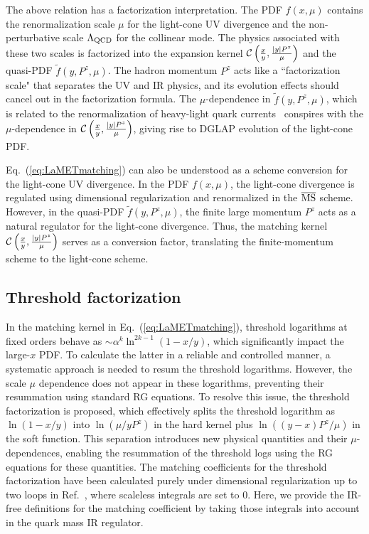 \documentclass[a4paper,11pt]{article}
\begin{document}
The above relation has a factorization interpretation. The PDF $ f(x,\mu) $ contains the renormalization scale $ \mu $ for the light-cone UV divergence and the non-perturbative scale $ \Lambda_{\rm QCD} $ for the collinear mode. The physics associated with these two scales is factorized into the expansion kernel $ {\cal C}\left(\frac{x}{y},\frac{|y| P^z}{\mu}\right) $ and the quasi-PDF $ \tilde{f}(y,P^z,\mu) $. The hadron momentum $ P^z $ acts like a ``factorization scale" that separates the UV and IR physics, and its evolution effects should cancel out in the factorization formula. The $\mu $-dependence in $ \tilde{f}(y,P^z,\mu) $, which is related to the renormalization of heavy-light quark currents~\cite{Ji:1991pr, Chetyrkin:2003vi, Braun:2020ymy, Grozin:2023dlk} conspires with the $ \mu $-dependence in $ {\cal C}\left(\frac{x}{y},\frac{|y| P^z}{\mu}\right) $, giving rise to DGLAP evolution of the light-cone PDF.

Eq.~(\ref{eq:LaMETmatching}) can also be understood as a scheme conversion for the light-cone UV divergence. In the PDF \( f(x,\mu) \), the light-cone divergence is regulated using dimensional regularization and renormalized in the \(\overline{\rm MS}\) scheme. However, in the quasi-PDF \( \tilde{f}(y,P^z,\mu) \), the finite large momentum \( P^z \) acts as a natural regulator for the light-cone divergence. Thus, the matching kernel \( {\cal C}\left(\frac{x}{y},\frac{|y| P^z}{\mu}\right) \) serves as a conversion factor, translating the finite-momentum scheme to the light-cone scheme.




\subsection{Threshold factorization}
In the matching kernel in Eq.~(\ref{eq:LaMETmatching}), threshold logarithms at fixed orders behave as $\sim \alpha^k \ln^{2k-1}\left(1-x/y\right)$, which significantly impact the large-$x$ PDF. To calculate the latter in a reliable and controlled manner, a systematic approach is needed to resum the threshold logarithms. However, the scale $\mu$ dependence does not appear in these logarithms, preventing their resummation using standard RG equations. To resolve this issue, the threshold factorization is proposed, which effectively splits the threshold logarithm as $\ln\left(1-x/y\right)$ into $\ln\left(\mu/y P^z\right)$ in the hard kernel plus $\ln\left((y-x) P^z/\mu\right)$ in the soft function. This separation introduces new physical quantities and their $\mu$-dependences, enabling the resummation of the threshold logs using the RG equations for these quantities. The matching coefficients for the threshold factorization have been calculated purely under dimensional regularization up to two loops in Ref.~\cite{Ji:2023pba}, where scaleless integrals are set to 0. Here, we provide the IR-free definitions for the matching coefficient by taking those integrals into account in the quark mass IR regulator.
\end{document}
